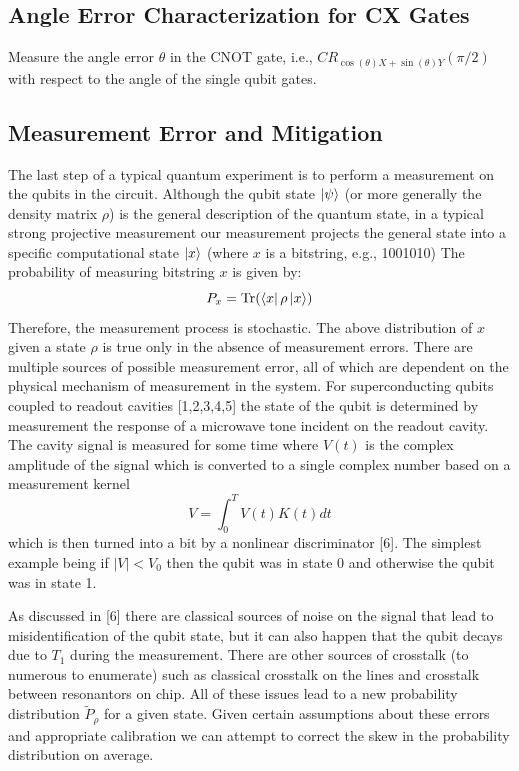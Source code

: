 \documentclass[11pt, oneside]{article}   	%
\begin{document}
\subsection{Angle Error Characterization for CX Gates}
Measure the angle error $\theta$ in the CNOT gate, i.e., $CR_{\cos(\theta)X+\sin(\theta)Y}(\pi/2)$ with respect to the angle of the single qubit gates.

\subsection{Measurement Error and Mitigation}
The last step of a typical quantum experiment is to perform a measurement on the qubits in the circuit. 
Although the qubit state $\ket{\psi}$ (or more generally the density matrix $\rho$) is the general description of the quantum state, in a typical strong projective measurement our measurement projects the general state into a specific computational state $\ket{x}$ (where $x$ is a bitstring, e.g.,  1001010) The probability of measuring bitstring $x$ is given by: 
\begin{equation}
P_x = \mathrm{Tr}(\bra{x} \rho \ket{x})
\end{equation}
Therefore, the measurement process is stochastic. 
The above distribution of $x$ given a state $\rho$ is true only in the absence of measurement errors. 
There are multiple sources of possible measurement error, all of which are dependent on the physical mechanism of measurement in the system. 
For superconducting qubits coupled to readout cavities [1,2,3,4,5] the state of the qubit is determined by measurement the response of a microwave tone incident on the readout cavity. The cavity signal is measured for some time where $V(t)$ is the complex amplitude of the signal which is converted to a single complex number based on a measurement kernel 
\begin{equation}
V = \int_0^{T} V(t) K(t) dt
\end{equation}
which is then turned into a bit by a nonlinear discriminator [6]. 
The simplest example being if $|V| < V_0$ then the qubit was in state 0 and otherwise the qubit was in state 1.

As discussed in [6] there are classical sources of noise on the signal that lead to misidentification of the qubit state, but it can also happen that the qubit decays due to $T_1$ during the measurement. There are other sources of crosstalk (to numerous to enumerate) such as classical crosstalk on the lines and crosstalk between resonantors on chip. All of these issues lead to a new probability distribution $\tilde{P}_{\rho}$ for a given state. Given certain assumptions about these errors and appropriate calibration we can attempt to correct the skew in the probability distribution on average.
\end{document}
